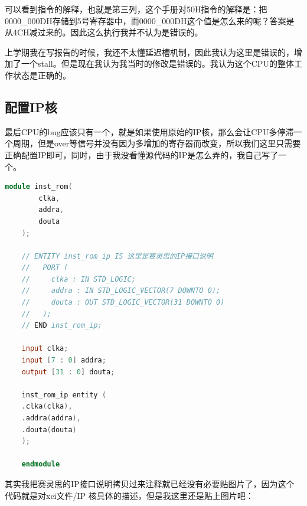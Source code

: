 \documentclass[a4paper]{article}
\begin{document}
可以看到指令的解释，也就是第三列，这个手册对50H指令的解释是：把0000\_000DH存储到5号寄存器中，而0000\_000DH这个值是怎么来的呢？答案是从4CH减过来的。因此这么执行我并不认为是错误的。

上学期我在写报告的时候，我还不太懂延迟槽机制，因此我认为这里是错误的，增加了一个stall。但是现在我认为我当时的修改是错误的。我认为这个CPU的整体工作状态是正确的。

\newpage

\subsection{配置IP核}

最后CPU的bug应该只有一个，就是如果使用原始的IP核，那么会让CPU多停滞一个周期，但是over等信号并没有因为多增加的寄存器而改变，所以我们这里只需要正确配置IP即可，同时，由于我没看懂源代码的IP是怎么弄的，我自己写了一个。


\begin{lstlisting}[language=Verilog]
    module inst_rom(
        clka,
        addra,
        douta
    );

    // ENTITY inst_rom_ip IS 这里是赛灵思的IP接口说明
    //   PORT (
    //     clka : IN STD_LOGIC;
    //     addra : IN STD_LOGIC_VECTOR(7 DOWNTO 0);
    //     douta : OUT STD_LOGIC_VECTOR(31 DOWNTO 0)
    //   );
    // END inst_rom_ip;

    input clka;
    input [7 : 0] addra;
    output [31 : 0] douta;

    inst_rom_ip entity (
    .clka(clka),
    .addra(addra),
    .douta(douta)
    );

    endmodule
\end{lstlisting}

其实我把赛灵思的IP接口说明拷贝过来注释就已经没有必要贴图片了，因为这个代码就是对xci文件/IP 核具体的描述，但是我这里还是贴上图片吧：
\end{document}
